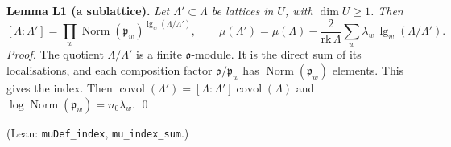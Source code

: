 \documentclass[11pt,letterpaper]{article}
\begin{document}
\textbf{Lemma L1 (a sublattice).} \emph{Let $\Lambda'\subset\Lambda$ be lattices in $U$, with
$\dim U\ge1$. Then}
\begin{equation}\label{lt:index}
 [\Lambda:\Lambda']=\prod_w\operatorname{Norm}(\mathfrak p_w)^{\lg_w(\Lambda/\Lambda')},\qquad
 \mu(\Lambda')=\mu(\Lambda)-\frac{2}{\mathrm{rk}\,\Lambda}\sum_w\lambda_w\,\lg_w(\Lambda/\Lambda').
\end{equation}
\emph{Proof.} The quotient $\Lambda/\Lambda'$ is a finite $\mathfrak o$-module. It is the direct sum of its
localisations, and each composition factor $\mathfrak o/\mathfrak p_w$ has
$\operatorname{Norm}(\mathfrak p_w)$ elements. This gives the index. Then
$\operatorname{covol}(\Lambda')=[\Lambda:\Lambda']\operatorname{covol}(\Lambda)$ and
$\log\operatorname{Norm}(\mathfrak p_w)=n_0\lambda_w$. \qed

\noindent (Lean: \texttt{muDef\_index}, \texttt{mu\_index\_sum}.)
\end{document}
